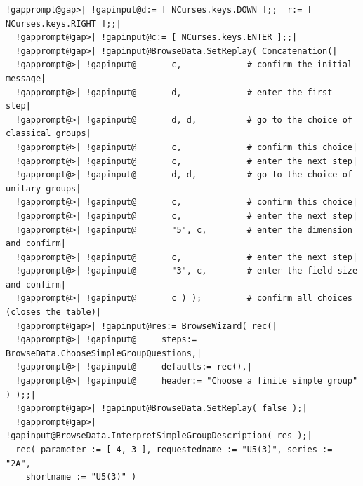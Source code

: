 \documentclass[a4paper,11pt]{report}
\begin{document}
{{{ 
\begin{Verbatim}[commandchars=!@|,fontsize=\small,frame=single,label=Example]
  !gapprompt@gap>| !gapinput@d:= [ NCurses.keys.DOWN ];;  r:= [ NCurses.keys.RIGHT ];;|
  !gapprompt@gap>| !gapinput@c:= [ NCurses.keys.ENTER ];;|
  !gapprompt@gap>| !gapinput@BrowseData.SetReplay( Concatenation(|
  !gapprompt@>| !gapinput@       c,             # confirm the initial message|
  !gapprompt@>| !gapinput@       d,             # enter the first step|
  !gapprompt@>| !gapinput@       d, d,          # go to the choice of classical groups|
  !gapprompt@>| !gapinput@       c,             # confirm this choice|
  !gapprompt@>| !gapinput@       c,             # enter the next step|
  !gapprompt@>| !gapinput@       d, d,          # go to the choice of unitary groups|
  !gapprompt@>| !gapinput@       c,             # confirm this choice|
  !gapprompt@>| !gapinput@       c,             # enter the next step|
  !gapprompt@>| !gapinput@       "5", c,        # enter the dimension and confirm|
  !gapprompt@>| !gapinput@       c,             # enter the next step|
  !gapprompt@>| !gapinput@       "3", c,        # enter the field size and confirm|
  !gapprompt@>| !gapinput@       c ) );         # confirm all choices (closes the table)|
  !gapprompt@gap>| !gapinput@res:= BrowseWizard( rec(|
  !gapprompt@>| !gapinput@     steps:= BrowseData.ChooseSimpleGroupQuestions,|
  !gapprompt@>| !gapinput@     defaults:= rec(),|
  !gapprompt@>| !gapinput@     header:= "Choose a finite simple group" ) );;|
  !gapprompt@gap>| !gapinput@BrowseData.SetReplay( false );|
  !gapprompt@gap>| !gapinput@BrowseData.InterpretSimpleGroupDescription( res );|
  rec( parameter := [ 4, 3 ], requestedname := "U5(3)", series := "2A", 
    shortname := "U5(3)" )
\end{Verbatim}
 

}}}
\end{document}
